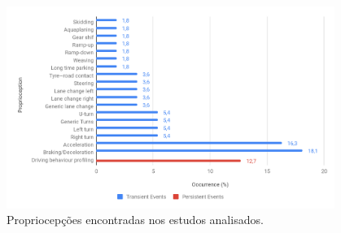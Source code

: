\begin{figure}[h!]
  \centering
  \caption{Propriocepções encontradas nos estudos analisados.}
   \label{fig:proprioception_occurrence}
   \includegraphics[width=0.95\textwidth]{figuras/fig3_5.png}
\end{figure}

















